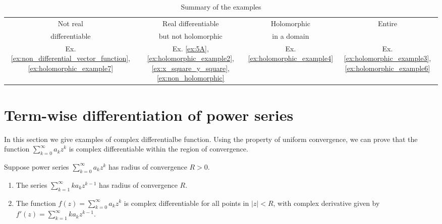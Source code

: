 \begin{table}
	\caption{Summary of the examples}
	\begin{center}
		\begin{tabular}{|c|c|c|c|} \hline
			Not real & Real differentiable   & Holomorphic & Entire \\
			differentiable & but not holomorphic  & in a domain & \\ \hline \hline 
			Ex. \ref{ex:non_differential_vector_function}, \ref{ex:holomorphic_example7} 
			& Ex. \ref{ex:5A}, \ref{ex:holomorphic_example2},
			\ref{ex:x_square_y_square},
			\ref{ex:non_holomorphic}
			& Ex. \ref{ex:holomorphic_example4}
			& Ex. \ref{ex:holomorphic_example3},  \ref{ex:holomorphic_example6}   \\ \hline 
		\end{tabular}
	\end{center}
\end{table}

\section{Term-wise differentiation of power series}


In this section we give examples of complex differentialbe function. Using the property of uniform convergence, we can prove that the function $\sum_{k=0}^\infty a_k z^k$ is complex differentiable within the region of convergence. 

\renewcommand{\labelenumi}{(\alph{enumi}).}
\begin{svgraybox}
	\begin{theorem} 		\label{thm:power_series_analytic}
		Suppose power series $\sum_{k=0}^\infty a_kz^k$ has radius of convergence $R>0$. 
		
		\begin{enumerate}
			\item The series $\sum_{k=1}^\infty k a_k z^{k-1}$ has radius of convergence $R$. 
			\item The function $ f(z) = \sum_{k=0}^\infty a_kz^k$ is complex differentiable for all points in $|z|<R$, with complex derivative given by $f'(z) = \sum_{k=1}^\infty k a_k z^{k-1}$.
		\end{enumerate}
	\end{theorem}
\end{svgraybox}



